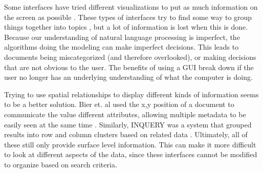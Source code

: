 \documentclass{article}
\begin{document}
Some interfaces have tried different visualizations to put as much information on the screen as possible \cite{Newman2010} \cite{Nowell1996} \cite{Shneiderman2000} \cite{Yost2006}.  These types of interfaces try to find some way to group things together into topics \cite{Newman2010}, but a lot of information is lost when this is done\cite{Nowell1996}.  Because our understanding of natural language processing is imperfect, the algorithms doing the modeling can make imperfect decisions.  This leads to documents being miscategorized (and therefore overlooked), or making decisions that are not obvious to the user.  The benefits of using a GUI break down if the user no longer has an underlying understanding of what the computer is doing.  

Trying to use spatial relationships to display different kinds of information seems to be a better solution\cite{Bier2005}\cite{Foo2007:ECDL}\cite{Foo2007:ICADL}\cite{Mothe1998}.   Bier et. al used the x,y position of a document to communicate the value different attributes, allowing multiple metadata to be easily seen at the same time \cite{Bier2005}.  %
Similarly, INQUERY was a system that grouped results into row and column clusters based on related data \cite{Mothe1998}.  Ultimately, all of these still only provide surface level information.  This can make it more difficult to look at different aspects of the data, since these interfaces cannot be modified to organize based on search criteria.
 

\end{document}
